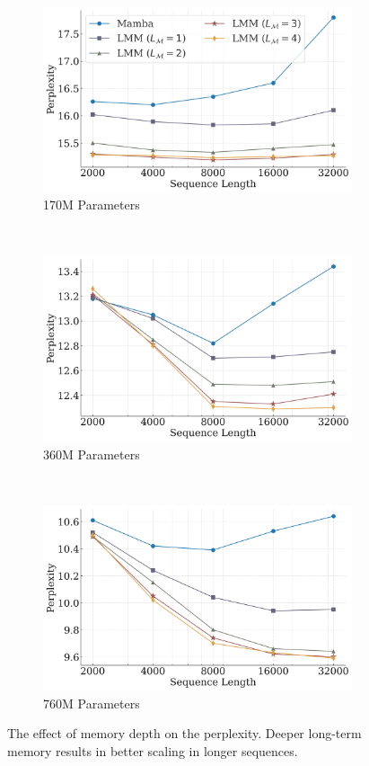 \begin{figure}[t!]
    \centering
    \begin{subfigure}{0.333\linewidth}
        \includegraphics[width=\linewidth]{Figures/deep-memory-1.png}
    \caption{170M Parameters}
    \end{subfigure}~
    \centering
    \begin{subfigure}{0.333\linewidth}
        \includegraphics[width=\linewidth]{Figures/deep-memory-2.png}
    \caption{360M Parameters}
    \end{subfigure}~
    \centering
    \begin{subfigure}{0.333\linewidth}
        \includegraphics[width=\linewidth]{Figures/deep-memory-3.png}
    \caption{760M Parameters}
    \end{subfigure}
    \caption{The effect of memory depth on the perplexity. Deeper long-term memory results in better scaling in longer sequences.}
    \label{fig:effect-deep-memory}
\end{figure}



